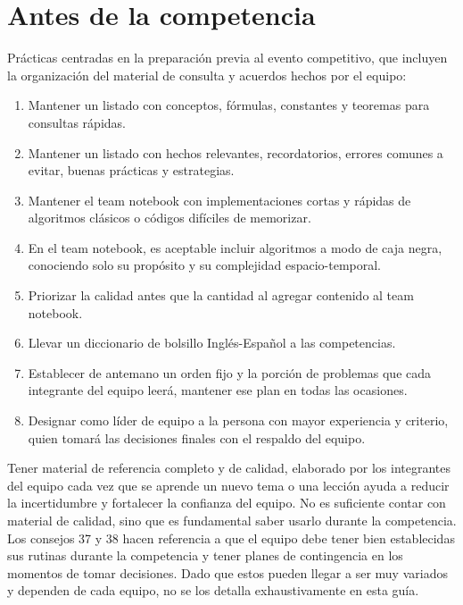 \section{Antes de la competencia}
Prácticas centradas en la preparación previa al evento competitivo, que incluyen la organización del material de consulta y acuerdos  hechos por el equipo:
\begin{enumerate}[resume=icpc]
    \item Mantener un listado con conceptos, fórmulas, constantes y teoremas para consultas rápidas.
    \item Mantener un listado con hechos relevantes, recordatorios, errores comunes a evitar, buenas prácticas y estrategias.
    \item Mantener el team notebook con implementaciones cortas y rápidas de algoritmos clásicos o códigos difíciles de memorizar.
    \item En el team notebook, es aceptable incluir algoritmos a modo de caja negra, conociendo solo su propósito y su complejidad espacio-temporal.
    \item Priorizar la calidad antes que la cantidad al agregar contenido al team notebook.
    \item Llevar un diccionario de bolsillo Inglés-Español a las competencias.
    \item Establecer de antemano un orden fijo y la porción de problemas que cada integrante del equipo leerá, mantener ese plan en todas las ocasiones.
    \item Designar como líder de equipo a la persona con mayor experiencia y criterio, quien tomará las decisiones finales con el respaldo del equipo.
\end{enumerate}
Tener material de referencia completo y de calidad, elaborado por los integrantes del equipo cada vez que se aprende un nuevo tema o una lección ayuda a reducir la incertidumbre y fortalecer la confianza del equipo. No es suficiente contar con material de calidad, sino que es fundamental saber usarlo durante la competencia. Los consejos 37 y 38 hacen referencia a que el equipo debe tener bien establecidas sus rutinas durante la competencia y tener planes de contingencia en los momentos de tomar decisiones. Dado que estos pueden llegar a ser muy variados y dependen de cada equipo, no se los detalla exhaustivamente en esta guía.
\pagebreak

